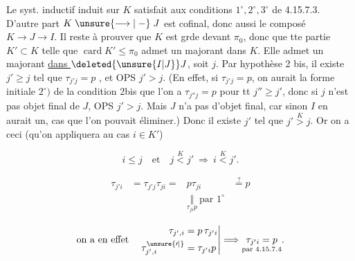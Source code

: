 
\deleted{\[\begin{aligned}\tau_{j'i}&=\tau_{j'j}\tau_{ji}={}&\tau_{j'j}p\\ &&\Vert\ \text{par }1^\circ\\ &&p\tau_{j'j}\end{aligned}\]}


Le syst. inductif induit sur $K$ satisfait aux conditions $1^\circ,2^\circ,3^\circ$ de 4.15.7.3.  D'autre part $K\mathrel{\unsure{\longrightarrow|\relbar}}J$ est cofinal, donc aussi le composé $K\longrightarrow J\longrightarrow I$. Il reste à prouver que $K$ est grde devant $\pi_0$, donc que tte partie $K'\subset K$ telle que $\operatorname{card}K'\leq\pi_0$ admet un majorant dans $K$. Elle admet un majorant \uline{dans $\deleted{\unsure{I|J}}J$}, soit $j$. Par hypothèse 2 bis, il existe $j'\geq j$ tel que $\tau_{j'j}=p$ , et OPS $j'>j$.  (En effet, si $\tau_{j'j}=p$, on aurait 
%
%
la forme initiale $2^\circ)$ de la condition 2bis que l'on a $\tau_{j''j}=p$ pour tt $j''\geq j'$, donc si $j$ n'est pas objet final de $J$, OPS $j'>j$. Mais $J$ n'a pas d'objet final, car sinon $I$ en aurait un, cas que l'on pouvait éliminer.) Donc il existe $j'$ tel que $j'\overset K>j$. Or on a ceci (qu'on appliquera au cas $i\in K'$)

\[i\leq j\quad\text{et}\quad j\overset K<j'\ \Longrightarrow\ i\overset K<j'.\]


\[\begin{aligned}\tau_{j'i}&=\tau_{j'j}\tau_{ji}={}&p\tau_{ji}&\overset{?}{=}p\\ &&\underset{\tau_{ji}p}{\Vert}\ \text{par }1^\circ\end{aligned}\]

\[\text{on a en effet}\quad\left.\begin{aligned}\tau_{j',i}&=p\,\tau_{j'i}\\ \tau^{\unsure{\prime|{}}}_{j',i}&=\tau_{j'i}p\end{aligned}\right|\Longrightarrow\underset{\text{par }4.15.7.4}{\tau_{j'i}=p}.\]

